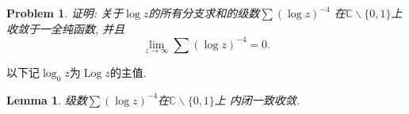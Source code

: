 \documentclass[a4paper, 12pt]{ctexart}
\title{\TITLE}
\author{\AUTHOR}
\date{\today}
\newtheorem{lemma}[theorem]{Lemma}
\theoremstyle{plain}
\newtheorem{problem}{Problem}[section]
\theoremstyle{plain}
\theoremstyle{plain}
\theoremstyle{nonumberplain}
\DeclareMathOperator{\Log}{Log}
\begin{document}

    \maketitle
    \thispagestyle{empty}





    \newpage
    \pagestyle{fancy}
    \linenumbers

    \begin{problem}
        证明: 关于$\log{z}$的所有分支求和的级数$\sum{(\log{z})^{-4}}$
        在$\mathbb{C}\backslash\{0, 1\}$上收敛于一全纯函数, 并且
        \begin{equation}
            \lim_{z\to\infty}{\sum{(\log{z})^{-4}}} = 0.
        \end{equation}
    \end{problem}

    以下记$\log_{0}{z}$为$\Log{z}$的主值.

    \begin{lemma}
        级数$\sum{(\log{z})^{-4}}$在$\mathbb{C}\backslash\{0, 1\}$上
        内闭一致收敛.
    \end{lemma}
\end{document}
